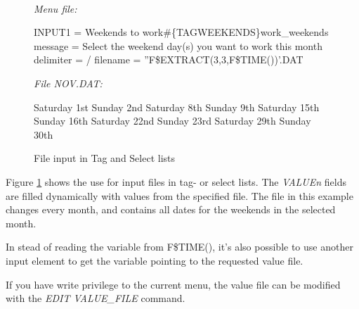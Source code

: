 \documentclass[a4paper]{book}
\renewcommand{\indent}{\hspace*{5mm}}
\begin{document}
\begin{figure}[ht]
\begin{minipage}[t]{\textwidth}
\hrulefill \\
\textsl{Menu file:} \newline
\begin{ttfamily}
 \newline
\indent INPUT1 = Weekends to work{\#}{\{}TAG\textbar WEEKENDS{\}}work{\_}weekends
\noindent[WEEKENDS] \newline
\indent message = Select the weekend day(s) you want to work this month \newline
\indent delimiter = / \newline
\indent filename = ''F{\$}EXTRACT(3,3,F{\$}TIME())'.DAT
\end{ttfamily}

\textsl{File NOV.DAT:} \newline
\begin{ttfamily}
\noindent Saturday 1st \newline
\noindent Sunday 2nd \newline
\noindent Saturday 8th \newline
\noindent Sunday 9th \newline
\noindent Saturday 15th \newline
\noindent Sunday 16th \newline
\noindent Saturday 22nd \newline
\noindent Sunday 23rd \newline
\noindent Saturday 29th \newline
\noindent Sunday 30th \newline
\end{ttfamily}
\caption{File input in Tag and Select lists}\label{fig:listfromfile}
\hrulefill
\end{minipage}
\end{figure}

Figure \ref{fig:listfromfile} shows the use for input files in tag- or select lists. The 
\textsl{VALUE\textit{n}} fields are filled dynamically with values from the specified file. 
The file in this example changes every month, and contains all dates for the 
weekends in the selected month.

In stead of reading the variable from F{\$}TIME(), it's also possible to use 
another input element to get the variable pointing to the requested value 
file.

If you have write privilege to the current menu, the value file can be 
modified with the \textsl{EDIT VALUE{\_}FILE} command.
\end{document}
